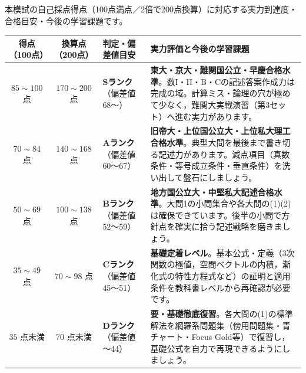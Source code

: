 \par\vspace{1.0mm}\noindent
{\footnotesize 本模試の自己採点得点（100点満点／2倍で200点換算）に対応する実力到達度・合格目安・今後の学習課題です。}
\par\vspace{1.5mm}
\begin{center}\footnotesize
\renewcommand{\arraystretch}{1.28}
\begin{tabular}{@{}cclp{26em}@{}}
\toprule
\textbf{得点（100点）} & \textbf{換算点（200点）} & \textbf{判定・偏差値目安} & \textbf{実力評価と今後の学習課題} \\
\midrule
$85 \sim 100$ 点 & $170 \sim 200$ 点 & \textbf{Sランク}（偏差値 68〜） & \textbf{東大・京大・難関国公立・早慶合格水準}。数I・II・B・Cの記述答案作成力は完成の域。計算ミス・論理の穴が極めて少なく，難関大実戦演習（第3セット）へ進む実力があります。 \\
$70 \sim 84$ 点 & $140 \sim 168$ 点 & \textbf{Aランク}（偏差値 60〜67） & \textbf{旧帝大・上位国公立大・上位私大理工合格水準}。典型大問を最後まで書き切る記述力があります。減点項目（真数条件・等号成立条件・垂直条件）を洗い出して盤石にしましょう。 \\
$50 \sim 69$ 点 & $100 \sim 138$ 点 & \textbf{Bランク}（偏差値 52〜59） & \textbf{地方国公立大・中堅私大記述合格水準}。大問1の小問集合や各大問の(1)(2)は確保できています。後半の小問で方針点を確実に拾う記述戦略を磨きましょう。 \\
$35 \sim 49$ 点 & $70 \sim 98$ 点 & \textbf{Cランク}（偏差値 45〜51） & \textbf{基礎定着レベル}。基本公式・定義（3次関数の極値，空間ベクトルの内積，漸化式の特性方程式など）の証明と適用条件を教科書レベルから再確認が必要です。 \\
$35$ 点未満 & $70$ 点未満 & \textbf{Dランク}（偏差値 〜44） & \textbf{要・基礎徹底復習}。各大問の(1)の標準解法を網羅系問題集（傍用問題集・青チャート・Focus Gold等）で復習し，基礎公式を自力で再現できるようにしましょう。 \\
\bottomrule
\end{tabular}
\end{center}



